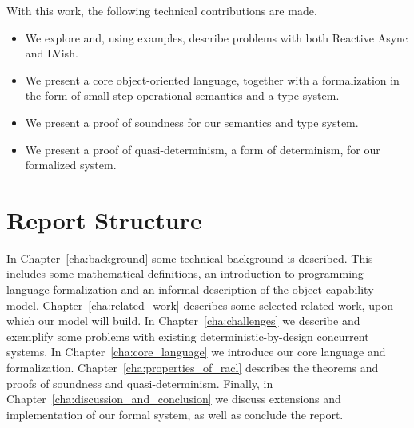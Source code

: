 With this work, the following technical contributions are made.
\begin{itemize}
  \item We explore and, using examples, describe problems with both Reactive
    Async and LVish.
  \item We present a core object-oriented language, together with a formalization
    in the form of small-step operational semantics and a type system. 
  \item We present a proof of soundness for our semantics and type system.
  \item We present a proof of quasi-determinism, a form of determinism, for our
    formalized system.
\end{itemize}


\section{Report Structure}%
\label{sec:report_structure}

In Chapter~\ref{cha:background} some technical background is described. This
includes some mathematical definitions, an introduction to programming language
formalization and an informal description of the object capability
model. Chapter~\ref{cha:related_work} describes some selected related work, upon
which our model will build. In Chapter~\ref{cha:challenges} we describe and
exemplify some problems with existing deterministic-by-design concurrent
systems. In Chapter~\ref{cha:core_language} we introduce our core language and
formalization. Chapter~\ref{cha:properties_of_racl} describes the theorems and
proofs of soundness and quasi-determinism. Finally, in
Chapter~\ref{cha:discussion_and_conclusion} we discuss extensions and
implementation of our formal system, as well as conclude the report.
